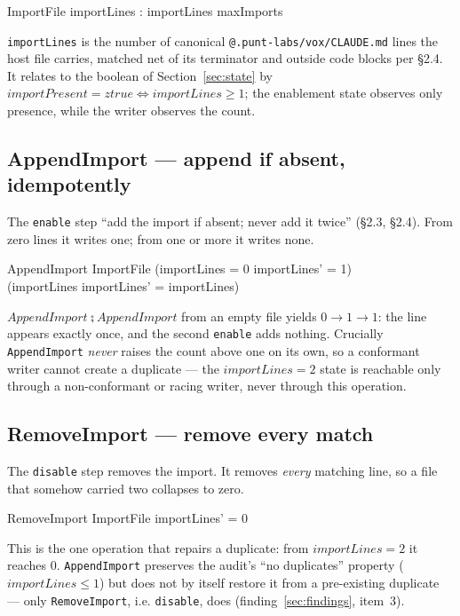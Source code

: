 \documentclass[a4paper,10pt,fleqn]{article}
\begin{document}
\begin{schema}{ImportFile}
  importLines : \nat
  \where
  importLines \leq maxImports
\end{schema}

\texttt{importLines} is the number of canonical \texttt{@.punt-labs/vox/CLAUDE.md}
lines the host file carries, matched net of its terminator and outside code
blocks per \S2.4. It relates to the boolean of Section~\ref{sec:state} by
$importPresent = ztrue \iff importLines \geq 1$; the enablement state observes
only presence, while the writer observes the count.

\subsection{AppendImport --- append if absent, idempotently}

The \texttt{enable} step ``add the import if absent; never add it twice''
(\S2.3, \S2.4). From zero lines it writes one; from one or more it writes none.

\begin{schema}{AppendImport}
  \Delta ImportFile
  \where
  (importLines = 0 \implies importLines' = 1) \\
  (importLines  \implies importLines' = importLines)
\end{schema}

$AppendImport \semi AppendImport$ from an empty file yields $0 \to 1 \to 1$: the
line appears exactly once, and the second \texttt{enable} adds nothing. Crucially
\texttt{AppendImport} \emph{never} raises the count above one on its own, so a
conformant writer cannot create a duplicate --- the $importLines = 2$ state is
reachable only through a non-conformant or racing writer, never through this
operation.

\subsection{RemoveImport --- remove every match}

The \texttt{disable} step removes the import. It removes \emph{every} matching
line, so a file that somehow carried two collapses to zero.

\begin{schema}{RemoveImport}
  \Delta ImportFile
  \where
  importLines' = 0
\end{schema}

This is the one operation that repairs a duplicate: from $importLines = 2$ it
reaches $0$. \texttt{AppendImport} preserves the audit's ``no duplicates''
property ($importLines \leq 1$) but does not by itself restore it from a
pre-existing duplicate --- only \texttt{RemoveImport}, i.e. \texttt{disable},
does (finding~\ref{sec:findings}, item~3).
\end{document}
